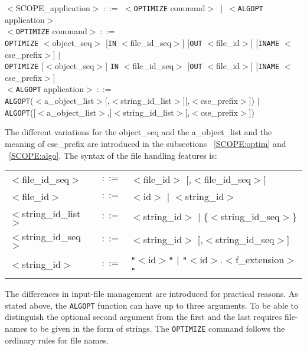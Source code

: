 $<$SCOPE\_application$>~::=$ $<${\tt OPTIMIZE} command$>~\mid~<${\tt ALGOPT} application$>$\\
$<${\tt OPTIMIZE} command$>~::=$\\
\hspace*{1cm}  {\tt OPTIMIZE} $<$object\_seq$>$ [{\tt IN} $<$file\_id\_seq$>$] [{\tt OUT} $<$file\_id$>$] [{\tt INAME} $<$cse\_prefix$>$] $\mid$\\
\hspace*{1cm}  {\tt OPTIMIZE} [$<$object\_seq$>$] {\tt IN} $<$file\_id\_seq$>$ [{\tt OUT} $<$file\_id$>$] [{\tt INAME} $<$cse\_prefix$>$]\\
$<${\tt ALGOPT} application$>~::=$\\
\hspace*{1cm}  {\tt ALGOPT}($<$a\_object\_list$>$[,$<$string\_id\_list$>$][,$<$cse\_prefix$>$]) $\mid$\\
\hspace*{1cm}  {\tt ALGOPT}([$<$a\_object\_list$>$,]$<$string\_id\_list$>$[,$<$cse\_prefix$>$])

The different variations for the object\_seq and
the a\_object\_list and the meaning of cse\_prefix are introduced
in the subsections ~\ref{SCOPE:optim} and ~\ref{SCOPE:algo}.
The syntax of the file handling features is:
\begin{center}
\begin{tabular}{lcl}
$<$file\_id\_seq$>$ & $::=$ & $<$file\_id$>$ [,$<$file\_id\_seq$>$]\\
$<$file\_id$>$ & $::=$ & $<$id$>$ $\mid$ $<$string\_id$>$\\
$<$string\_id\_list$>$ & $::=$ & $<$string\_id$>$ $\mid$
 \{$<$string\_id\_seq$>$\}\\
$<$string\_id\_seq$>$ & $::=$ & $<$string\_id$>$ [,$<$string\_id\_seq$>$]\\
$<$string\_id$>$ & $::=$ & {\tt "}$<$id$>${\tt "} $\mid$
{\tt "}$<$id$>.<$f\_extension$>${\tt "}
\end{tabular}
\end{center}

The differences in input-file management are introduced for practical reasons.
As stated above, the {\tt ALGOPT} function can have up to three arguments.
To be able to distinguish the optional second argument from the first and the
last requires file-names to be  given in the form of strings. The
{\tt OPTIMIZE} command follows the ordinary {\REDUCE} rules for file names.

